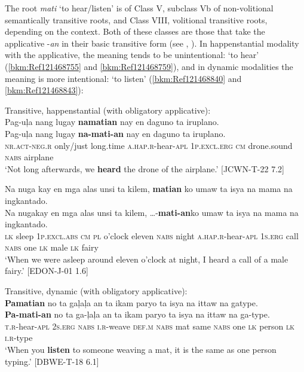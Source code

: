 The root \textit{mati} ‘to hear/listen’ is of Class V, subclass Vb of non-volitional semantically transitive roots, and Class VIII, volitional transitive roots, depending on the context. Both of these classes are those that take the applicative -\textit{an} in their basic transitive form (see , ). In happenstantial modality with the applicative, the meaning tends to be unintentional: ‘to hear’ (\ref{bkm:Ref121468755} and \ref{bkm:Ref121468759}), and in dynamic modalities the meaning is more intentional: ‘to listen’ (\ref{bkm:Ref121468840} and \ref{bkm:Ref121468843}):

\ea
Transitive, happenstantial (with obligatory applicative): \\
\label{bkm:Ref121468755}
Pag-uļa  nang  lugay  \textbf{namatian}  nay  en   daguno  ta  iruplano. \\\smallskip
\gll Pag-uļa  nang  lugay  \textbf{na-mati-an}  nay  en   daguno  ta  iruplano. \\
\textsc{nr.act}-\textsc{neg.r}  only/just  long.time  \textsc{a.hap.r}-hear-\textsc{apl}  1\textsc{p.excl.erg}  \textsc{cm} drone.sound  \textsc{nabs}  airplane \\
\glt `Not long afterwards, we \textbf{heard} the drone of the airplane.’ [JCWN-T-22 7.2]
\z

\ea
\label{bkm:Ref121468759}
Na  nuga  kay  en  mga  alas  unsi  ta  kilem, \textbf{matian}   ko  umaw  ta  isya  na  mama  na  ingkantado. \\\smallskip
\gll Na  nuga\footnotemark  kay  en  mga  alas  unsi  ta  kilem, \textsc{ …-}\textbf{mati-an}\footnotemark   ko  umaw  ta  isya  na  mama  na  ingkantado. \\
\textsc{lk}  sleep  1\textsc{p.excl.abs}  \textsc{cm}  \textsc{pl}  o’clock  eleven  \textsc{nabs}  night \textsc{a.hap.r}-hear-\textsc{apl}  1\textsc{s.erg}  call  \textsc{nabs}  one  \textsc{lk}  male  \textsc{lk}  fairy \\
\glt `When we were asleep around eleven o’clock at night, I heard a call of a male fairy.’ [EDON-J-01 1.6]
\z

\ea
Transitive, dynamic (with obligatory applicative): \\
\label{bkm:Ref121468840}
\textbf{Pamatian}  no  ta  gaļaļa  an  ta  ikam  paryo   ta  isya  na  ittaw  na  gatype. \\\smallskip
\gll \textbf{Pa-mati-an}  no  ta  ga-ļaļa  an  ta  ikam  paryo   ta  isya  na  ittaw  na  ga-type. \\
\textsc{t.r}-hear-\textsc{apl}  2\textsc{s.erg}  \textsc{nabs}  \textsc{i.r}-weave  \textsc{def.m}  \textsc{nabs}  mat  same \textsc{nabs}  one  \textsc{lk}  person  \textsc{lk}  \textsc{i.r}-type \\
\glt  ‘When you \textbf{listen} to someone weaving a mat, it is the same as one person typing.’ [DBWE-T-18 6.1]
\z

